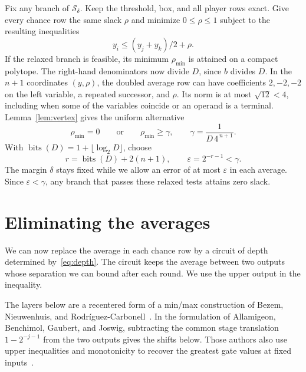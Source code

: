 \documentclass[11pt,letterpaper]{article}
\newcommand{\bits}{\operatorname{bits}}
\newcommand{\sys}{\mathcal S}
\begin{document}
Fix any branch of \(\sys_\delta\). Keep the threshold, box, and all player rows
exact. Give every chance row the same slack \(\rho\) and minimize \(0\le\rho\le1\)
subject to the resulting inequalities
\[
                        y_i\le (y_j+y_k)/2+\rho .
\]
If the relaxed branch is feasible, its minimum \(\rho_{\min}\) is attained on a
compact polytope. The right-hand denominators now divide \(D\), since \(b\)
divides \(D\). In the \(n+1\) coordinates \((y,\rho)\), the doubled average row
can have coefficients \(2,-2,-2\) on the left variable, a repeated successor, and
\(\rho\). Its norm is at most \(\sqrt{12}<4\), including when some of the variables
coincide or an operand is a terminal. Lemma~\ref{lem:vertex} gives the uniform
alternative
\begin{equation}\label{eq:gap}
       \rho_{\min}=0\qquad\text{or}\qquad
       \rho_{\min}\ge\gamma,\qquad
       \gamma=\frac{1}{D\,4^{\,n+1}} .
\end{equation}
With \(\bits(D)=1+\lfloor\log_2D\rfloor\), choose
\begin{equation}\label{eq:depth}
       r=\bits(D)+2(n+1),\qquad \varepsilon=2^{-r-1}<\gamma .
\end{equation}
The margin \(\delta\) stays fixed while we allow an error of at most
\(\varepsilon\) in each average. Since \(\varepsilon<\gamma\), any branch that
passes these relaxed tests attains zero slack.

\section{Eliminating the averages}

We can now replace the average in each chance row by a circuit of depth
determined by~\eqref{eq:depth}. The circuit keeps the average between two
outputs whose separation we can bound after each round. We use the upper
output in the inequality.

The layers below are a recentered form of a min/max construction of Bezem,
Nieuwenhuis, and Rodr\'iguez-Carbonell~\cite[\S3]{bnr}. In the formulation of
Allamigeon, Benchimol, Gaubert, and Joswig, subtracting the common stage translation
\(1-2^{-j-1}\) from the two outputs gives the shifts below. Those authors also
use upper inequalities and monotonicity to recover the greatest gate values at fixed
inputs~\cite[Prop.~20 and eq.~(30)]{abgj}.
\end{document}
